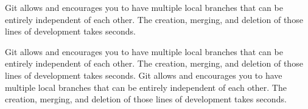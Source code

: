 Git allows and encourages you to have multiple local branches that can be entirely independent of each other. The creation, merging, and deletion of those lines of development takes seconds.


Git allows and encourages you to have multiple local branches that can be entirely independent of each other. The creation, merging, and deletion of those lines of development takes seconds.
Git allows and encourages you to have multiple local branches that can be entirely independent of each other. The creation, merging, and deletion of those lines of development takes seconds.